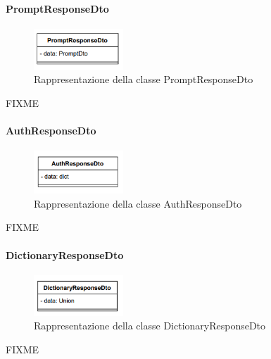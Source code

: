 \paragraph{PromptResponseDto} \label{PromptResponseDto}
\begin{figure}[h!]
    \centering
    \includegraphics[width=0.30\textwidth]{assets/Backend/prompt_response_dto.png}
    \caption{Rappresentazione della classe PromptResponseDto}
  \end{figure}
\par FIXME

\paragraph{AuthResponseDto} \label{AuthResponseDto}
\begin{figure}[h!]
    \centering
    \includegraphics[width=0.30\textwidth]{assets/Backend/auth_response_dto.png}
    \caption{Rappresentazione della classe AuthResponseDto}
  \end{figure}
\par FIXME

\paragraph{DictionaryResponseDto} \label{DictionaryResponseDto}
\begin{figure}[h!]
    \centering
    \includegraphics[width=0.30\textwidth]{assets/Backend/dictionary_response_dto.png}
    \caption{Rappresentazione della classe DictionaryResponseDto}
  \end{figure}
\par FIXME